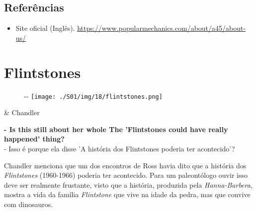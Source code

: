 \hypertarget{referuxeancias-1}{%
\subsection{Referências}\label{referuxeancias-1}}

\begin{itemize}
\tightlist
\item
  \sloppy Site oficial (Inglês). \url{https://www.popularmechanics.com/about/a45/about-us/}
\end{itemize}

\hypertarget{flintstones}{%
\section{Flintstones}\label{flintstones}}

\begin{figure}[!ht]
  \begin{adjustwidth}{-\oddsidemargin-1in}{-\rightmargin}
    \centering
    \texttt{[image: ./S01/img/18/flintstones.png]}
  \end{adjustwidth}
\end{figure}

\begin{tcolorbox}[enhanced,center upper,
    drop fuzzy shadow southeast, boxrule=0.3pt,
    lower separated=false, breakable,
    colframe=black!30!dialogoBorder,colback=white]
\begin{minipage}[c]{0.16\linewidth}
   & \centering \scriptsize{Chandler}
\end{minipage}
\hfill
\begin{minipage}[c]{0.8\linewidth}
  \textbf{- Is this still about her whole The 'Flintstones could have really happened' thing?}\\
  - Isso é porque ela disse 'A história dos Flintstones poderia ter acontecido'?
\end{minipage}
\end{tcolorbox}

Chandler menciona que um dos encontros de Ross havia dito que a história
dos \emph{Flintstones} (1960-1966) poderia ter acontecido. Para um
paleontólogo ouvir isso deve ser realmente frustante, visto que a
história, produzida pela \emph{Hanna-Barbera}, mostra a vida da família
\emph{Flintstone} que vive na idade da pedra, mas que convive com
dinosauros.

